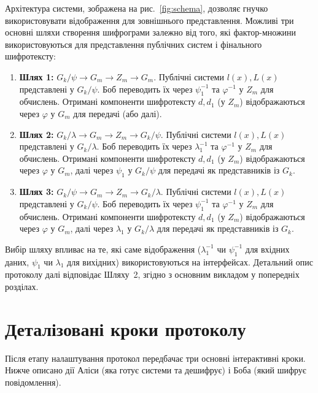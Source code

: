 Архітектура системи, зображена на рис.~\ref{fig:schema}, дозволяє гнучко використовувати відображення для зовнішнього представлення.
Можливі три основні шляхи створення шифрограми залежно від того, які фактор-множини використовуються для представлення публічних систем і фінального шифротексту:
\begin{enumerate}
    \item \textbf{Шлях 1:} $G_k/\psi \to G_m \to Z_m \to G_m$.
    Публічні системи $l(x), L(x)$ представлені у $G_k/\psi$.
    Боб переводить їх через $\psi_1^{-1}$ та $\varphi^{-1}$ у $Z_m$ для обчислень.
    Отримані компоненти шифротексту $d, d_1$ (у $Z_m$) відображаються через $\varphi$ у $G_m$ для передачі (або далі).
    \item \textbf{Шлях 2:} $G_k/\lambda \to G_m \to Z_m \to G_k/\psi$.
    Публічні системи $l(x), L(x)$ представлені у $G_k/\lambda$.
    Боб переводить їх через $\lambda_1^{-1}$ та $\varphi^{-1}$ у $Z_m$ для обчислень.
    Отримані компоненти шифротексту $d, d_1$ (у $Z_m$) відображаються через $\varphi$ у $G_m$, далі через $\psi_1$ у $G_k/\psi$ для передачі як представників із $G_k$.
    \item \textbf{Шлях 3:} $G_k/\psi \to G_m \to Z_m \to G_k/\lambda$.
    Публічні системи $l(x), L(x)$ представлені у $G_k/\psi$.
    Боб переводить їх через $\psi_1^{-1}$ та $\varphi^{-1}$ у $Z_m$ для обчислень.
    Отримані компоненти шифротексту $d, d_1$ (у $Z_m$) відображаються через $\varphi$ у $G_m$, далі через $\lambda_1$ у $G_k/\lambda$ для передачі як представників із $G_k$.
\end{enumerate}
Вибір шляху впливає на те, які саме відображення ($\lambda_1^{-1}$ чи $\psi_1^{-1}$ для вхідних даних, $\psi_1$ чи $\lambda_1$ для вихідних) використовуються на інтерфейсах.
Детальний опис протоколу далі відповідає Шляху~2, згідно з основним викладом у попередніх розділах.


\section{Деталізовані кроки протоколу}
\label{sec:protocol_steps}
Після етапу налаштування протокол передбачає три основні інтерактивні кроки.
Нижче описано дії Аліси (яка готує системи та дешифрує) і Боба (який шифрує повідомлення).

